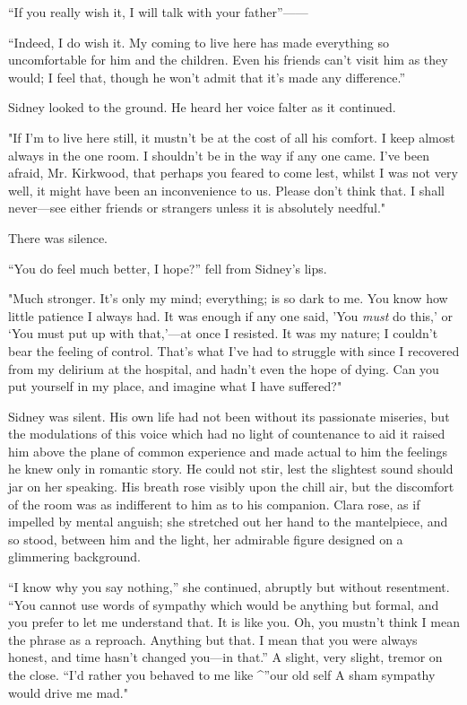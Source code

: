 ``If you really wish it, I will talk with your father''{{------}}

``Indeed, I do wish it. My coming to live here has made everything so
uncomfortable for him and the children. Even his friends can't visit him
as they would; I feel that, though he won't admit that it's made any
difference.''

Sidney looked to the ground. He heard her voice falter as it continued.

"If I'm to live here still, it mustn't be at the cost of all his
comfort. I keep almost {\protect\hypertarget{83}{}{}} always in the one
room. I shouldn't be in the way if any one came. I've been afraid, Mr.
Kirkwood, that perhaps you feared to come lest, whilst I was not very
well, it might have been an inconvenience to us. Please don't think
that. I shall never---see either friends or strangers unless it is
absolutely needful."

There was silence.

``You do feel much better, I hope?'' fell from Sidney's lips.

"Much stronger. It's only my mind; everything; is so dark to me. You
know how little patience I always had. It was enough if any one said,
'You \emph{must} do this,' or `You must put up with that,'---at once I
resisted. It was my nature; I couldn't bear the feeling of control.
That's what I've had to struggle with since I recovered from my delirium
at the hospital, and hadn't even the hope of dying. Can you put yourself
in my place, and imagine what I have suffered?"

Sidney was silent. His own life had not been without its passionate
miseries, but the modulations of this voice which had no light of
countenance to aid it raised him above the
{\protect\hypertarget{84}{}{}} plane of common experience and made
actual to him the feelings he knew only in romantic story. He could not
stir, lest the slightest sound should jar on her speaking. His breath
rose visibly upon the chill air, but the discomfort of the room was as
indifferent to him as to his companion. Clara rose, as if impelled by
mental anguish; she stretched out her hand to the mantelpiece, and so
stood, between him and the light, her admirable figure designed on a
glimmering background.

``I know why you say nothing,'' she continued, abruptly but without
resentment. ``You cannot use words of sympathy which would be anything
but formal, and you prefer to let me understand that. It is like you.
Oh, you mustn't think I mean the phrase as a reproach. Anything but
that. I mean that you were always honest, and time hasn't changed
you---in that.'' A slight, very slight, tremor on the close. ``I'd
rather you behaved to me like \^{}''our old self A sham sympathy would
drive me mad."

